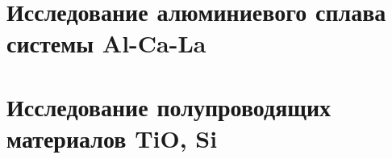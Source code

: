 \FloatBarrier

\section{Исследование алюминиевого сплава системы Al-Ca-La}\label{sec:ch4/sect2}

\FloatBarrier

\section{Исследование полупроводящих материалов TiO, Si}\label{sec:ch4/sect3}
